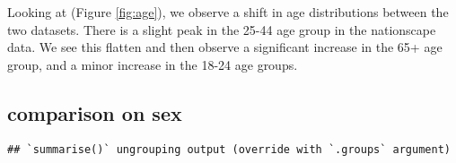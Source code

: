 \documentclass[
]{article}
\newenvironment{Shaded}{\begin{snugshade}}{\end{snugshade}}
\newcommand{\DataTypeTok}[1]{\textcolor[rgb]{0.13,0.29,0.53}{#1}}
\newcommand{\DecValTok}[1]{\textcolor[rgb]{0.00,0.00,0.81}{#1}}
\newcommand{\KeywordTok}[1]{\textcolor[rgb]{0.13,0.29,0.53}{\textbf{#1}}}
\newcommand{\NormalTok}[1]{#1}
\newcommand{\OperatorTok}[1]{\textcolor[rgb]{0.81,0.36,0.00}{\textbf{#1}}}
\newcommand{\StringTok}[1]{\textcolor[rgb]{0.31,0.60,0.02}{#1}}
\begin{document}
Looking at (Figure \ref{fig:age}), we observe a shift in age distributions between the two datasets. There is a slight peak in the 25-44 age group in the nationscape data. We see this flatten and then observe a significant increase in the 65+ age group, and a minor increase in the 18-24 age groups.

\hypertarget{comparison-on-sex}{%
\subsection{comparison on sex}\label{comparison-on-sex}}

\begin{Shaded}
\end{Shaded}

\begin{verbatim}
## `summarise()` ungrouping output (override with `.groups` argument)
\end{verbatim}

\begin{Shaded}
\end{Shaded}
\end{document}
